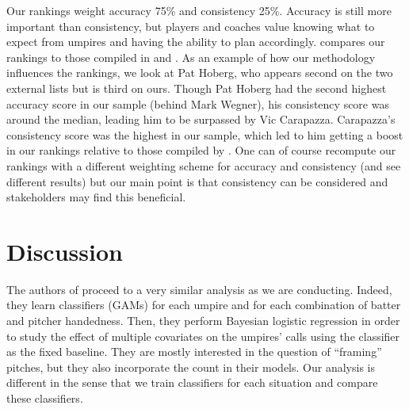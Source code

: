 \documentclass[letterpaper,12pt]{article}
\begin{document}
Our rankings weight accuracy 75\% and consistency 25\%. 
Accuracy is still more important than consistency, but players and coaches value knowing what to expect from umpires and having the ability to plan accordingly. 
 compares our rankings to those compiled in \cite{ump-audit} and \cite{bu-umps}.
As an example of how our methodology influences the rankings, we look at Pat Hoberg, who appears second on the two external lists but is third on ours. 
Though Pat Hoberg had the second highest accuracy score in our sample (behind Mark Wegner), his consistency score was around the median, leading him to be surpassed by Vic Carapazza. 
Carapazza's consistency score was the highest in our sample, which led to him getting a boost in our rankings relative to those compiled by \cite{bu-umps}.
One can of course recompute our rankings with a different weighting scheme for accuracy and consistency (and see different results) but our main point is that consistency can be considered and stakeholders may find this beneficial.




\section{Discussion}\label{sec:discussion}

The authors of \cite{deshpande2017safe2} proceed to a very similar analysis as we are conducting. Indeed, they learn classifiers (GAMs) for each umpire and for each combination of batter and pitcher handedness. 
Then, they perform Bayesian logistic regression in order to study the effect of multiple covariates on the umpires' calls using the classifier as the fixed baseline. They are mostly interested in the question of ``framing'' pitches, but they also incorporate the count in their models. 
Our analysis is different in the sense that we train classifiers for each situation and compare these classifiers.
\end{document}
